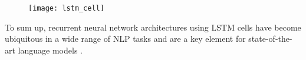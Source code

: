 \begin{figure}[H]
	\centering
	\texttt{[image: lstm\_cell]}
	\label{fig:ffarch}
\end{figure}

To sum up, recurrent neural network architectures using LSTM cells have become ubiquitous in a wide range of NLP tasks and are a key element for state-of-the-art language models \cite{jozefowicz2016exploring}.